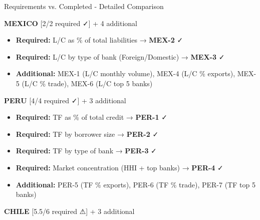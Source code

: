 \documentclass[aspectratio=169,11pt]{beamer}
\begin{document}
\begin{frame}{Requirements vs. Completed - Detailed Comparison}
\tiny

\textbf{MEXICO} \textcolor{green!60!black}{[2/2 required ✓]} + 4 additional

\begin{itemize}
    \item[\textcolor{green!60!black}{✓}] \textbf{Required:} L/C as \% of total liabilities → \textbf{MEX-2} ✓
    \item[\textcolor{green!60!black}{✓}] \textbf{Required:} L/C by type of bank (Foreign/Domestic) → \textbf{MEX-3} ✓
    \item \textbf{Additional:} MEX-1 (L/C monthly volume), MEX-4 (L/C \% exports), MEX-5 (L/C \% trade), MEX-6 (L/C top 5 banks)
\end{itemize}

\vspace{0.15cm}

\textbf{PERU} \textcolor{green!60!black}{[4/4 required ✓]} + 3 additional

\begin{itemize}
    \item[\textcolor{green!60!black}{✓}] \textbf{Required:} TF as \% of total credit → \textbf{PER-1} ✓
    \item[\textcolor{green!60!black}{✓}] \textbf{Required:} TF by borrower size → \textbf{PER-2} ✓
    \item[\textcolor{green!60!black}{✓}] \textbf{Required:} TF by type of bank → \textbf{PER-3} ✓
    \item[\textcolor{green!60!black}{✓}] \textbf{Required:} Market concentration (HHI + top banks) → \textbf{PER-4} ✓
    \item \textbf{Additional:} PER-5 (TF \% exports), PER-6 (TF \% trade), PER-7 (TF top 5 banks)
\end{itemize}

\vspace{0.15cm}

\textbf{CHILE} \textcolor{orange!80!black}{[5.5/6 required ⚠]} + 3 additional


\end{frame}
\end{document}

